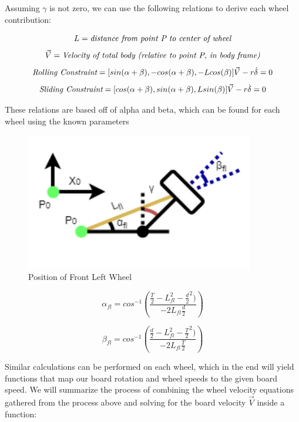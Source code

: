 \documentclass[letterpaper,12pt]{article}
\begin{document}
Assuming $\gamma$ is not zero, we can use the following relations to derive each wheel contribution:

\[L = \emph{distance from point P to center of wheel}\]
\[\vec{V} = \emph{Velocity of total body (relative to point P, in body frame)}\]
\begin{equation}
    \emph{Rolling Constraint} =
    [sin(\alpha + \beta), -cos(\alpha + \beta), -Lcos(\beta)]\vec{V} - r\dot{\delta} = 0
\end{equation}
\begin{equation}
    \emph{Sliding Constraint} =
    [cos(\alpha + \beta), sin(\alpha + \beta), Lsin(\beta)]\vec{V} - r\dot{\delta} = 0
\end{equation}

These relations are based off of alpha and beta, which can be found for each wheel using the known parameters

\begin{figure}[!h]
\caption{Position of Front Left Wheel}
\includegraphics[width=10cm]{figs/FL.png}
\centering
\end{figure}

\begin{equation}
    \alpha _{fl} = cos^{-1}(\frac{\frac{T}{2}-L _{fl}^2-\frac{d}{2}^{2})}{-2L _{fl}\frac{d}{2}})
\end{equation}

\begin{equation}
    \beta _{fl} = cos^{-1}(\frac{\frac{d}{2}-L _{fl}^2-\frac{T}{2}^{2})}{-2L _{fl}\frac{T}{2}})
\end{equation}

Similar calculations can be performed on each wheel, which in the end will yield functions that map our board rotation and wheel speeds to the given board speed. We will summarize the process of combining the wheel velocity equations gathered from the process above and solving for the board velocity $\vec{V}$ inside a function:
\end{document}
